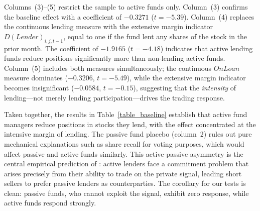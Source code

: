Columns~(3)--(5) restrict the sample to active funds only. Column~(3) confirms the baseline effect with a coefficient of $-0.3271$ ($t = -5.39$). Column~(4) replaces the continuous lending measure with the extensive margin indicator $D(\mathit{Lender})_{i,j,t-1}$, equal to one if the fund lent any shares of the stock in the prior month. The coefficient of $-1.9165$ ($t = -4.18$) indicates that active lending funds reduce positions significantly more than non-lending active funds. Column~(5) includes both measures simultaneously; the continuous $OnLoan$ measure dominates ($-0.3206$, $t = -5.49$), while the extensive margin indicator becomes insignificant ($-0.0584$, $t = -0.15$), suggesting that the \textit{intensity} of lending---not merely lending participation---drives the trading response.

Taken together, the results in Table~\ref{table_baseline} establish that active fund managers reduce positions in stocks they lend, with the effect concentrated at the intensive margin of lending. The passive fund placebo (column~2) rules out pure mechanical explanations such as share recall for voting purposes, which would affect passive and active funds similarly. This active-passive asymmetry is the central empirical prediction of \citet{Nurisso2026}: active lenders face a commitment problem that arises precisely from their ability to trade on the private signal, leading short sellers to prefer passive lenders as counterparties. The corollary for our tests is clean: passive funds, who cannot exploit the signal, exhibit zero response, while active funds respond strongly.

